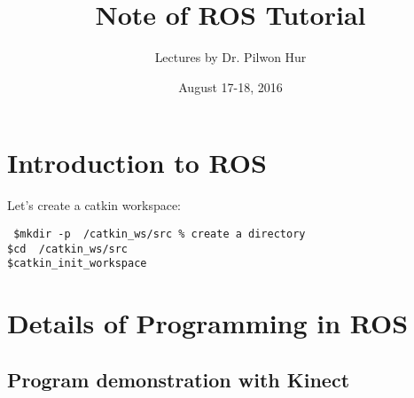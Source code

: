 \documentclass{article}
\title{Note of ROS Tutorial}
\author{Lectures by Dr. Pilwon Hur}
\date{August 17-18, 2016}
\begin{document}
\maketitle
\section{Introduction to ROS}
Let's create a catkin workspace:
\begin{shaded}
\noindent\texttt{\noindent
	\$\quad mkdir -p ~/catkin\_ws/src \quad \% create a directory\\
	 \$\quad cd ~/catkin\_ws/src\\
	 \$\quad catkin\_init\_workspace}	 
\end{shaded}











\section{Details of Programming in ROS}






\subsection{Program demonstration with Kinect}






%
\end{document}
